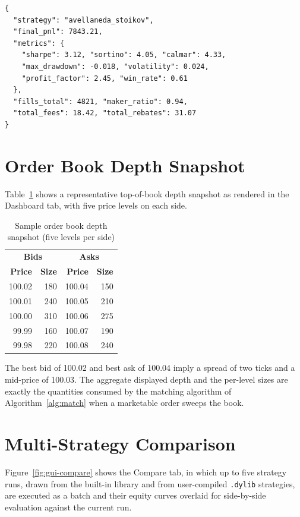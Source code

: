 \documentclass[12pt,oneside,a4paper]{report}
\begin{document}
\begin{lstlisting}[style=pystyle,caption={Exported tear-sheet metrics (market making)},label={lst:tearsheet}]
{
  "strategy": "avellaneda_stoikov",
  "final_pnl": 7843.21,
  "metrics": {
    "sharpe": 3.12, "sortino": 4.05, "calmar": 4.33,
    "max_drawdown": -0.018, "volatility": 0.024,
    "profit_factor": 2.45, "win_rate": 0.61
  },
  "fills_total": 4821, "maker_ratio": 0.94,
  "total_fees": 18.42, "total_rebates": 31.07
}
\end{lstlisting}

\section{Order Book Depth Snapshot}

Table~\ref{tab:bookdepth} shows a representative top-of-book depth snapshot as rendered in the Dashboard tab, with five price levels on each side.

\begin{table}[H]
\centering
\caption{Sample order book depth snapshot (five levels per side)}
\label{tab:bookdepth}
\small
\begin{tabular}{rr|rr}
\toprule
\multicolumn{2}{c|}{\textbf{Bids}} & \multicolumn{2}{c}{\textbf{Asks}} \\
\textbf{Price} & \textbf{Size} & \textbf{Price} & \textbf{Size} \\
\midrule
100.02 & 180 & 100.04 & 150 \\
100.01 & 240 & 100.05 & 210 \\
100.00 & 310 & 100.06 & 275 \\
99.99  & 160 & 100.07 & 190 \\
99.98  & 220 & 100.08 & 240 \\
\bottomrule
\end{tabular}
\end{table}

The best bid of 100.02 and best ask of 100.04 imply a spread of two ticks and a mid-price of 100.03. The aggregate displayed depth and the per-level sizes are exactly the quantities consumed by the matching algorithm of Algorithm~\ref{alg:match} when a marketable order sweeps the book.

\section{Multi-Strategy Comparison}

Figure~\ref{fig:gui-compare} shows the Compare tab, in which up to five strategy runs, drawn from the built-in library and from user-compiled \texttt{.dylib} strategies, are executed as a batch and their equity curves overlaid for side-by-side evaluation against the current run.
\end{document}
